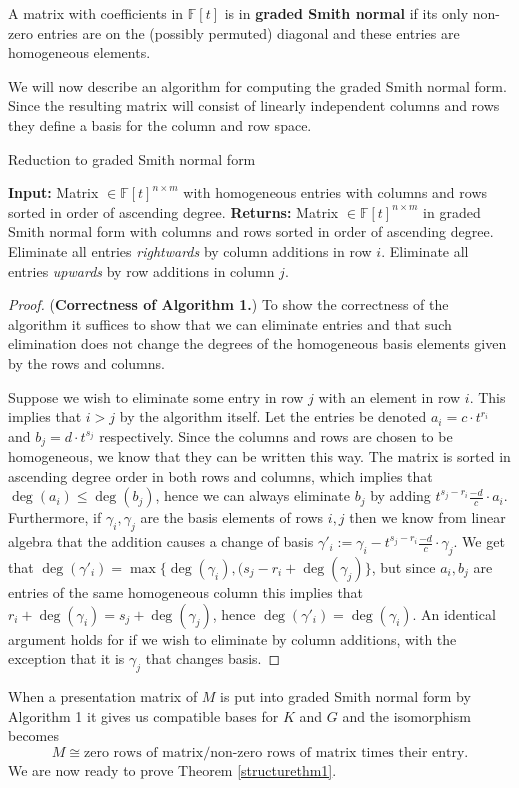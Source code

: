 \begin{definition}
A matrix with coefficients in $\mathbb{F}[t]$ is in \textbf{graded Smith normal} if its only non-zero entries are on the (possibly permuted) diagonal and these entries are homogeneous elements.
\end{definition}

We will now describe an algorithm for computing the graded Smith normal form. Since the resulting matrix will consist of linearly independent columns and rows they define a basis for the column and row space.

\begin{algorithm}
\caption{Reduction to graded Smith normal form \cite{skraba, Zomorodian2005}}\label{smith}
\begin{algorithmic}[1]
  \State \textbf{Input:} Matrix $ \in \mathbb{F}[t]^{n \times m}$ with homogeneous entries with columns and rows sorted in order of ascending degree.
  \State \textbf{Returns:} Matrix $ \in \mathbb{F}[t]^{n \times m}$ in graded Smith normal form with columns and rows sorted in order of ascending degree.
  \State Eliminate all entries \textit{rightwards} by column additions in row $i$.
  \State Eliminate all entries \textit{upwards} by row additions in column $j$.
  \EndFor
\end{algorithmic}
\end{algorithm}
\begin{proof}(\textbf{Correctness of Algorithm 1.})
  To show the correctness of the algorithm it suffices to show that we can eliminate entries and that such elimination does not change the degrees of the homogeneous basis elements given by the rows and columns.

  Suppose we wish to eliminate some entry in row $j$ with an element in row $i$. This implies that $ i > j$ by the algorithm itself. Let the entries be denoted $a_{i}= c \cdot t^{r_{i}}$ and $b_{j} = d \cdot t^{s_{j}}$ respectively. Since the columns and rows are chosen to be homogeneous, we know that they can be written this way. The matrix is sorted in ascending degree order in both rows and columns, which implies that $\deg(a_{i}) \leq \deg(b_{j})$, hence we can always eliminate $b_{j}$ by adding $t^{s_{j}-r_{i}} \frac{-d}{c} \cdot a_{i}$. Furthermore, if $\gamma_{i},\gamma_{j}$ are the basis elements of rows $i,j$ then we know from linear algebra that the addition causes a change of basis $\gamma'_{i}:=\gamma_{i}-t^{s_{j}-r_{i}} \frac{-d}{c} \cdot \gamma_{j}$. We get that $\deg(\gamma'_{i})=\max\{\deg(\gamma_{i}), (s_{j}-r_{i}+\deg(\gamma_{j})\}$, but since $a_{i},b_{j}$ are entries of the same homogeneous column this implies that $r_{i} + \deg(\gamma_{i}) = s_{j} + \deg(\gamma_{j})$, hence $\deg(\gamma'_{i}) = \deg(\gamma_{i})$. An identical argument holds for if we wish to eliminate by column additions, with the exception that it is $\gamma_{j}$ that changes basis.
\end{proof}
When a presentation matrix of $M$ is put into graded Smith normal form by Algorithm 1 it gives us compatible bases for $K$ and $G$ and the isomorphism becomes \[M\cong \text{zero rows of matrix}/\text{non-zero rows of matrix times their entry}.\]
We are now ready to prove Theorem \ref{structurethm1}.

